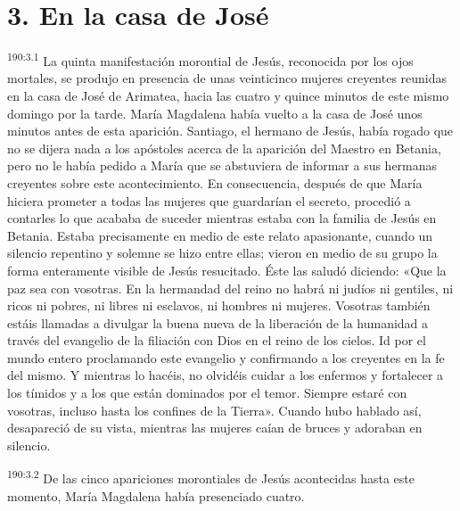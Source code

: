 \section*{3. En la casa de José}
\par 
\textsuperscript{190:3.1} La quinta manifestación morontial de Jesús, reconocida por los ojos mortales, se produjo en presencia de unas veinticinco mujeres creyentes reunidas en la casa de José de Arimatea, hacia las cuatro y quince minutos de este mismo domingo por la tarde. María Magdalena había vuelto a la casa de José unos minutos antes de esta aparición. Santiago, el hermano de Jesús, había rogado que no se dijera nada a los apóstoles acerca de la aparición del Maestro en Betania, pero no le había pedido a María que se abstuviera de informar a sus hermanas creyentes sobre este acontecimiento. En consecuencia, después de que María hiciera prometer a todas las mujeres que guardarían el secreto, procedió a contarles lo que acababa de suceder mientras estaba con la familia de Jesús en Betania. Estaba precisamente en medio de este relato apasionante, cuando un silencio repentino y solemne se hizo entre ellas; vieron en medio de su grupo la forma enteramente visible de Jesús resucitado. Éste las saludó diciendo: «Que la paz sea con vosotras. En la hermandad del reino no habrá ni judíos ni gentiles, ni ricos ni pobres, ni libres ni esclavos, ni hombres ni mujeres. Vosotras también estáis llamadas a divulgar la buena nueva de la liberación de la humanidad a través del evangelio de la filiación con Dios en el reino de los cielos. Id por el mundo entero proclamando este evangelio y confirmando a los creyentes en la fe del mismo. Y mientras lo hacéis, no olvidéis cuidar a los enfermos y fortalecer a los tímidos y a los que están dominados por el temor. Siempre estaré con vosotras, incluso hasta los confines de la Tierra». Cuando hubo hablado así, desapareció de su vista, mientras las mujeres caían de bruces y adoraban en silencio.

\par 
\textsuperscript{190:3.2} De las cinco apariciones morontiales de Jesús acontecidas hasta este momento, María Magdalena había presenciado cuatro.


